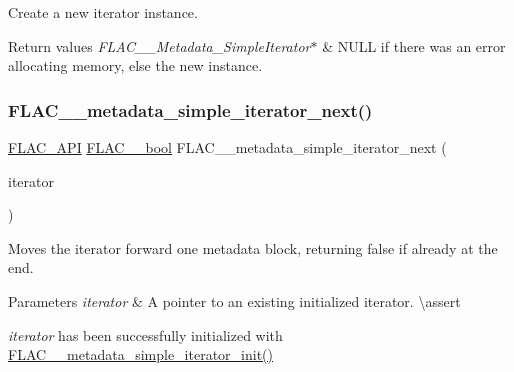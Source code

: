 Create a new iterator instance.


\begin{DoxyRetVals}{Return values}
{\em F\+L\+A\+C\+\_\+\+\_\+\+Metadata\+\_\+\+Simple\+Iterator$\ast$} & {\ttfamily N\+U\+LL} if there was an error allocating memory, else the new instance. \\
\hline
\end{DoxyRetVals}
\mbox{\label{group__flac__metadata__level1_gacac860d14fc0ff37cc2c034d3f972320}} 
\subsubsection{\texorpdfstring{FLAC\_\_metadata\_simple\_iterator\_next()}{FLAC\_\_metadata\_simple\_iterator\_next()}}
{\footnotesize\ttfamily \mbox{\hyperlink{group__flac__export_ga56ca07df8a23310707732b1c0007d6f5}{F\+L\+A\+C\+\_\+\+A\+PI}} \mbox{\hyperlink{ordinals_8h_a95103469f1cbd78b8cf250194985b34e}{F\+L\+A\+C\+\_\+\+\_\+bool}} F\+L\+A\+C\+\_\+\+\_\+metadata\+\_\+simple\+\_\+iterator\+\_\+next (\begin{DoxyParamCaption}\item[{\mbox{\hyperlink{group__flac__metadata__level1_ga6accccddbb867dfc2eece9ee3ffecb3a}{F\+L\+A\+C\+\_\+\+\_\+\+Metadata\+\_\+\+Simple\+Iterator}} $\ast$}]{iterator }\end{DoxyParamCaption})}

Moves the iterator forward one metadata block, returning {\ttfamily false} if already at the end.


\begin{DoxyParams}{Parameters}
{\em iterator} & A pointer to an existing initialized iterator. \textbackslash{}assert 
\begin{DoxyCode}{1}
\end{DoxyCode}
 {\itshape iterator} has been successfully initialized with \mbox{\hyperlink{group__flac__metadata__level1_ga2a055cca4e6e06ae62517c8b0fa6e8a3}{F\+L\+A\+C\+\_\+\+\_\+metadata\+\_\+simple\+\_\+iterator\+\_\+init()}} \\
\hline
\end{DoxyParams}

